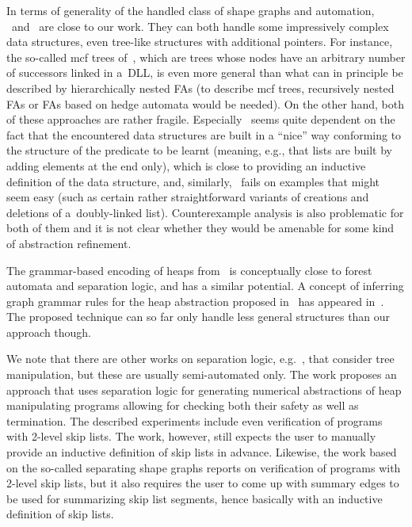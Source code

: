 {In terms of generality of the handled class of shape graphs and automation,
\cite{indPrSynt07}~and~\cite{locle:secondorder} are close to our work. 
They can both handle some impressively complex data structures, even tree-like structures
with additional pointers.
For instance, the so-called mcf
trees of~\cite{indPrSynt07}, which are trees whose nodes have an arbitrary number of successors
linked in a~DLL, is even more general than what can in principle
be described by hierarchically nested FAs (to describe mcf trees, recursively
nested FAs or FAs based on hedge automata would be needed).
On the other hand, both of these approaches are rather fragile. Especially~\cite{indPrSynt07}
seems quite dependent on the fact that the encountered
data structures are built in a ``nice'' way conforming to the structure of the
predicate to be learnt (meaning, e.g., that lists are built by adding elements
at the end only), which is close to providing an inductive definition of the
data structure, and, similarly, \cite{locle:secondorder}~fails on examples that
might seem easy (such as certain rather straightforward variants of creations
and deletions of a~doubly-linked list).
%
Counterexample analysis is also problematic for both of them and it is not clear
whether they would be amenable for some kind of abstraction refinement.
%

The grammar-based encoding of heaps from~\cite{juggrnaut10} is conceptually close to forest automata and separation logic, and has a similar potential.
A concept of inferring graph grammar rules for the heap abstraction proposed
in~\cite{juggrnaut10} has appeared in~\cite{juggrnaut-learning12}.
%
The proposed technique can so far only handle less general structures than our
approach though.

We note that there
are other works on separation logic, e.g.~\cite{ndqc07}, that consider tree
manipulation, but these are usually semi-automated only. 
%
The work \cite{thor10} proposes an approach that uses separation logic for
generating numerical abstractions of heap manipulating programs allowing for
checking both their safety as well as termination. The described experiments
include even verification of programs with 2-level skip lists.
The work, however,
still expects the user to manually provide an inductive definition of skip lists
in advance. Likewise, the work \cite{sas07:chang_rival_necula} based on the so-called separating
shape graphs reports on verification of programs with 2-level skip lists, but it
also requires the user to come up with summary edges to be used for summarizing
skip list segments, hence basically with an inductive definition of skip lists.


}
